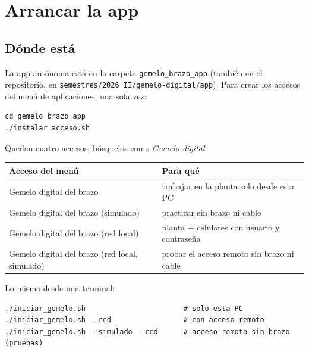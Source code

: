 \documentclass[a4paper,11pt]{article}
\newcommand{\codigo}[1]{\texttt{#1}}
\begin{document}
\section{Arrancar la app}

\subsection{Dónde está}
La app autónoma está en la carpeta \codigo{gemelo\_brazo\_app} (también en el repositorio, en \nolinkurl{semestres/2026_II/gemelo-digital/app}). Para crear los accesos del menú de aplicaciones, una sola vez:
\begin{lstlisting}
cd gemelo_brazo_app
./instalar_acceso.sh
\end{lstlisting}
Quedan cuatro accesos; búsquelos como \emph{Gemelo digital}:

\begin{center}\small
\begin{tabularx}{\linewidth}{>{\raggedright}p{6.4cm} >{\raggedright\arraybackslash}X}
\toprule
\textbf{Acceso del menú} & \textbf{Para qué}\\
\midrule
Gemelo digital del brazo & trabajar en la planta solo desde esta PC\\
Gemelo digital del brazo (simulado) & practicar sin brazo ni cable\\
Gemelo digital del brazo (red local) & planta + celulares con usuario y contraseña\\
Gemelo digital del brazo (red local, simulado) & probar el acceso remoto sin brazo ni cable\\
\bottomrule
\end{tabularx}
\end{center}

Lo mismo desde una terminal:
\begin{lstlisting}
./iniciar_gemelo.sh                       # solo esta PC
./iniciar_gemelo.sh --red                 # con acceso remoto
./iniciar_gemelo.sh --simulado --red      # acceso remoto sin brazo (pruebas)
\end{lstlisting}
\end{document}
